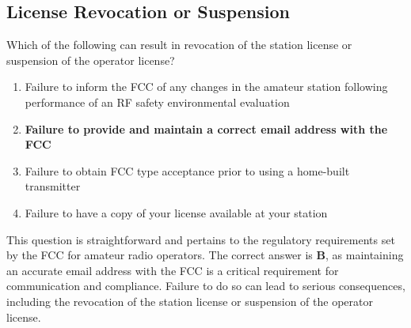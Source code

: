 \subsection{License Revocation or Suspension}
\label{T1C07}

\begin{tcolorbox}[colback=gray!10!white,colframe=black!75!black,title=T1C07]
Which of the following can result in revocation of the station license or suspension of the operator license?
\begin{enumerate}[label=\Alph*,noitemsep]
    \item Failure to inform the FCC of any changes in the amateur station following performance of an RF safety environmental evaluation
    \item \textbf{Failure to provide and maintain a correct email address with the FCC}
    \item Failure to obtain FCC type acceptance prior to using a home-built transmitter
    \item Failure to have a copy of your license available at your station
\end{enumerate}
\end{tcolorbox}

This question is straightforward and pertains to the regulatory requirements set by the FCC for amateur radio operators. The correct answer is \textbf{B}, as maintaining an accurate email address with the FCC is a critical requirement for communication and compliance. Failure to do so can lead to serious consequences, including the revocation of the station license or suspension of the operator license.